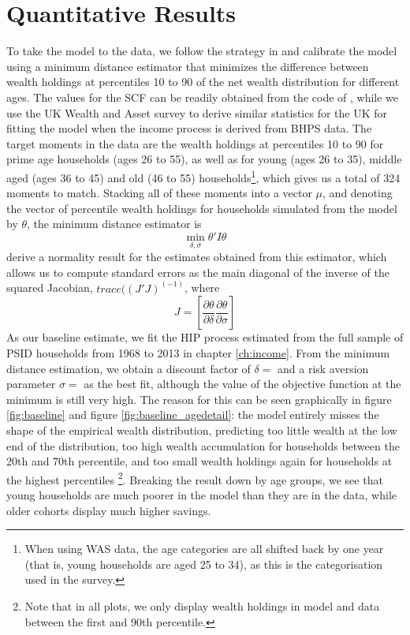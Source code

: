 \section{Quantitative Results}\label{sec:qr}
To take the model to the data, we follow the strategy in \citet{HintermaierKoeniger2011}
and calibrate the model using a minimum 
distance estimator that minimizes the difference between wealth holdings at percentiles 
10 to 90 of the net wealth distribution for different ages. The values for the 
SCF can be readily obtained from the code of \citet{HintermaierKoeniger2011}, 
while we use the UK Wealth and Asset survey to derive similar statistics for the 
UK for fitting the model when the income process is derived from BHPS data.
The target moments in the data are the wealth holdings at percentiles 10 to 90
for prime age households (ages 26 to 55), as well as for young (ages 26 to 35), 
middle aged (ages 36 to 45) and old (46 to 55) households\footnote{When using 
WAS data, the age categories are all shifted back by one year (that is, young 
households are aged 25 to 34), as this is the categorisation used in the survey.},
which gives us a total of 324 moments to match. Stacking all of these moments
into a vector $\mu$, and denoting the vector of percentile wealth holdings
for households simulated from the model by $\theta$, the minimum distance estimator is 
$$
\min_{\delta, \sigma} \theta' I \theta
$$
\citet{HintermaierKoeniger2011} derive a normality result for the estimates obtained
from this estimator, which allows us to compute standard errors as the main 
diagonal of the inverse of the squared Jacobian, $trace((J'J)^(-1)$, where
$$
J = \left[ \frac{\partial \theta}{\partial \delta} \frac{\partial \theta}{\partial \sigma} \right]
$$
As our baseline estimate, we fit the HIP process estimated from the full sample 
of PSID households from 1968 to 2013 in chapter \ref{ch:income}. From the minimum 
distance estimation, we obtain a discount factor of $\delta=$ and a risk 
aversion parameter $\sigma=$ as the best fit, although the value of the objective
function at the minimum is still very high. The reason for this can be seen
graphically in figure \ref{fig:baseline} and figure \ref{fig:baseline_agedetail}:
the model entirely misses the shape of the empirical wealth distribution, predicting
too little wealth at the low end of the distribution, too high 
wealth accumulation for households between the 20th and 70th percentile, and
too small wealth holdings again for households at the highest percentiles
\footnote{Note that in all plots, we only display wealth holdings in model and 
data between the first and 90th percentile.}. Breaking the result down by age 
groups, we see that young households are much poorer in the model than they are
in the data, while older cohorts display much higher savings. 

